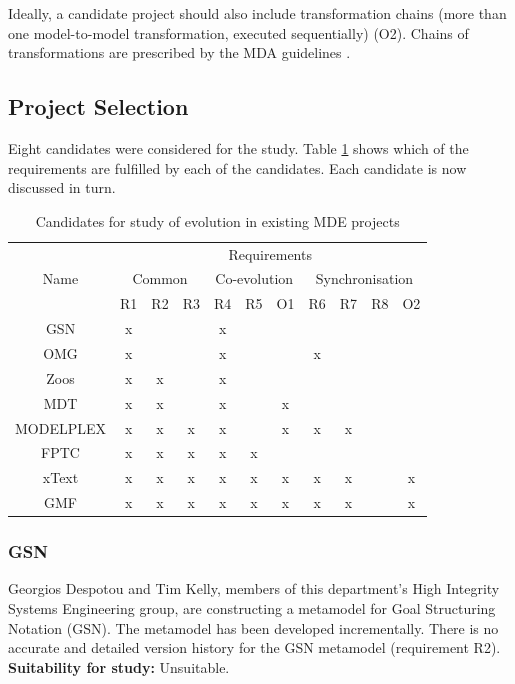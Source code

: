 Ideally, a candidate project should also include transformation chains (more than one model-to-model transformation, executed sequentially) (O2). Chains of transformations are prescribed by the MDA guidelines \cite{kleppe03mda}.


\subsection{Project Selection}
\label{subsec:project_selection}
Eight candidates were considered for the study. Table \ref{tab:candidates} shows which of the requirements are fulfilled by each of the candidates. Each candidate is now discussed in turn.

\begin{table}
	\caption{Candidates for study of evolution in existing MDE projects}
	\centering
	\begin{tabular}{|c||c|c|c||c|c|c||c|c|c|c|}
		\hline
		\multirow{3}{*}{Name} & \multicolumn{10}{|c|}{Requirements} \\
		\cline{2-11}
		          & \multicolumn{3}{|c||}{Common} & \multicolumn{3}{|c||}{Co-evolution} & \multicolumn{4}{|c|}{Synchronisation} \\
		\cline{2-11}
		          & R1 & R2 & R3 & R4 & R5 & O1 & R6 & R7 & R8 & O2 \\
		\hline
		GSN       & x  &    &    & x  &    &    &    &    &    &    \\
		\hline
		OMG       & x  &    &    & x  &    &    & x  &    &    &    \\
		\hline
		Zoos      & x  & x  &    & x  &    &    &    &    &    &    \\
		\hline
		MDT       & x  & x  &    & x  &    & x  &    &    &    &    \\
		\hline
		MODELPLEX & x  & x  & x  & x  &    & x  & x  & x  &    &    \\
		\hline
		FPTC      & x  & x  & x  & x  & x  &    &    &    &    &    \\
		\hline
		xText     & x  & x  & x  & x  & x  & x  & x  & x  &    & x  \\
		\hline
		GMF       & x  & x  & x  & x  & x  & x  & x  & x  &    & x  \\
		\hline
	\end{tabular}
	\label{tab:candidates}
\end{table}

\subsubsection{GSN}
\label{par:gsn}
Georgios Despotou and Tim Kelly, members of this department's High Integrity Systems Engineering group, are constructing a metamodel for Goal Structuring Notation (GSN). The metamodel has been developed incrementally. There is no accurate and detailed version history for the GSN metamodel (requirement R2). \textbf{Suitability for study:} Unsuitable.


